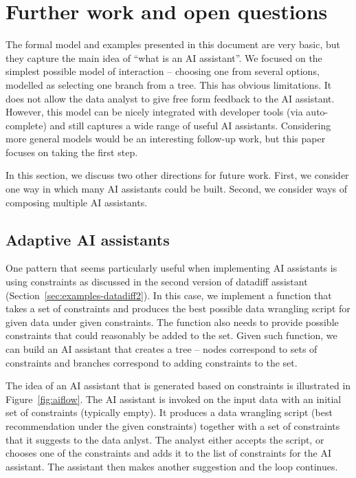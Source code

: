 \documentclass{article}
\begin{document}
\section{Further work and open questions}
The formal model and examples presented in this document are very basic, but they capture the
main idea of ``what is an AI assistant''. We focused on the simplest possible model of 
interaction -- choosing one from several options, modelled as selecting one branch from a tree.
This has obvious limitations. It does not allow the data analyst to give free form feedback 
to the AI assistant. However, this model can be nicely integrated with developer tools (via 
auto-complete) and still captures a wide range of useful AI assistants. Considering more general
models would be an interesting follow-up work, but this paper focuses on taking the first step.


In this section, we discuss two other directions for future work. First, we consider one way in
which many AI assistants could be built. Second, we consider ways of composing multiple AI 
assistants.

\subsection{Adaptive AI assistants}
One pattern that seems particularly useful when implementing AI assistants is using constraints
as discussed in the second version of datadiff assistant (Section~\ref{sec:examples-datadiff2}).
In this case, we implement a function that takes a set of constraints and produces the best 
possible data wrangling script for given data under given constraints. The function also needs
to provide possible constraints that could reasonably be added to the set. Given such function,
we can build an AI assistant that creates a tree -- nodes correspond to sets of constraints and
branches correspond to adding constraints to the set. 

The idea of an AI assistant that is generated based on constraints is illustrated in 
Figure~\ref{fig:aiflow}. The AI assistant is invoked on the input data with an initial set of
constraints (typically empty). It produces a data wrangling script (best recommendation under
the given constraints) together with a set of constraints that it suggests to the data anlyst.
The analyst either accepts the script, or chooses one of the constraints and adds it to the
list of constraints for the AI assistant. The assistant then makes another suggestion and the
loop continues.
\end{document}

